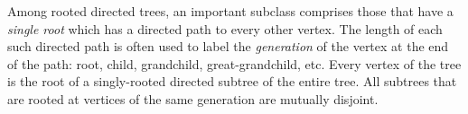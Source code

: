 Among rooted directed trees, an important subclass comprises those
that have a {\em single root} which has a directed path to every other
vertex.  The length of each such directed path is often used to label
the {\it generation}
of the vertex at the end of the path: root, child, grandchild,
great-grandchild, etc.
Every vertex of the tree is the root of a singly-rooted directed
subtree of the entire tree.  All subtrees that are rooted at vertices of
the same generation are mutually disjoint.
\bigskip

\noindent {}

\bigskip


